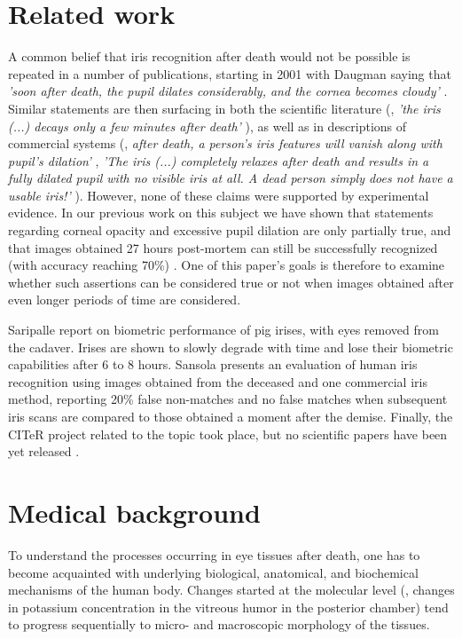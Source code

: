 \documentclass[10pt,twocolumn,letterpaper]{article}
\begin{document}
\section{Related work}
A common belief that iris recognition after death would not be possible is repeated in a number of publications, starting in 2001 with Daugman saying that \emph{'soon after death, the pupil dilates considerably, and the cornea becomes cloudy'} \cite{DaugmanPostMortem}. Similar statements are then surfacing in both the scientific literature (\eg, \emph{'the iris (...) decays only a few minutes after death'} \cite{SaeedPostMortem}), as well as in descriptions of commercial systems (\eg, \emph{after death, a person's iris features will vanish along with pupil's dilation'} \cite{IriTechPostMortem}, \emph{'The iris (...) completely relaxes after death and results in a fully dilated pupil with no visible iris at all. A dead person simply does not have a usable iris!'} \cite{IrisGuardPostMortem}). However, none of these claims were supported by experimental evidence. In our previous work on this subject we have shown that statements regarding corneal opacity and excessive pupil dilation are only partially true, and that images obtained 27 hours post-mortem can still be successfully recognized (with accuracy reaching 70\%) \cite{TrokielewiczPostMortemICB2016}. One of this paper's goals is therefore to examine whether such assertions can be considered true or not when images obtained after even longer periods of time are considered.

Saripalle \etal \cite{PostMortemPigs} report on biometric performance of pig irises, with eyes removed from the cadaver. Irises are shown to slowly degrade with time and lose their biometric capabilities after 6 to 8 hours. Sansola \cite{BostonPostMortem} presents an evaluation of human iris recognition using images obtained from the deceased and one commercial iris method, reporting 20\% false non-matches and no false matches when subsequent iris scans are compared to those obtained a moment after the demise. Finally, the CITeR project related to the topic took place, but no scientific papers have been yet released \cite{RossPostMortem}. 

\section{Medical background}

\label{sec:Medical}
To understand the processes occurring in eye tissues after death, one has to become acquainted with underlying biological, anatomical, and biochemical mechanisms of the human body. Changes started at the molecular level (\eg, changes in potassium concentration in the vitreous humor in the posterior chamber) tend to progress sequentially to micro- and macroscopic morphology of the tissues.
\end{document}
